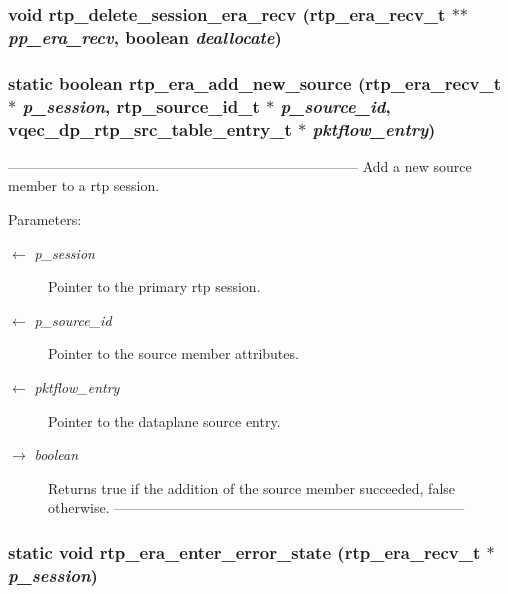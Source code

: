 \subsubsection{\setlength{\rightskip}{0pt plus 5cm}void rtp\_\-delete\_\-session\_\-era\_\-recv (\bf{rtp\_\-era\_\-recv\_\-t} $\ast$$\ast$ {\em pp\_\-era\_\-recv}, boolean {\em deallocate})}\label{rtp__era__recv_8c_ae0de64f6e196bf7a913d89433676de7}


\subsubsection{\setlength{\rightskip}{0pt plus 5cm}static boolean rtp\_\-era\_\-add\_\-new\_\-source (\bf{rtp\_\-era\_\-recv\_\-t} $\ast$ {\em p\_\-session}, rtp\_\-source\_\-id\_\-t $\ast$ {\em p\_\-source\_\-id}, vqec\_\-dp\_\-rtp\_\-src\_\-table\_\-entry\_\-t $\ast$ {\em pktflow\_\-entry})\hspace{0.3cm}{\tt  [static]}}\label{rtp__era__recv_8c_8cb96027af7de798ef6f5eebdfc0c857}


--------------------------------------------------------------------------- Add a new source member to a rtp session.

\begin{Desc}
\item[Parameters:]
\begin{description}
\item[\mbox{$\leftarrow$} {\em p\_\-session}]Pointer to the primary rtp session. \item[\mbox{$\leftarrow$} {\em p\_\-source\_\-id}]Pointer to the source member attributes. \item[\mbox{$\leftarrow$} {\em pktflow\_\-entry}]Pointer to the dataplane source entry. \item[\mbox{$\rightarrow$} {\em boolean}]Returns true if the addition of the source member succeeded, false otherwise. --------------------------------------------------------------------------- \end{description}
\end{Desc}
\subsubsection{\setlength{\rightskip}{0pt plus 5cm}static void rtp\_\-era\_\-enter\_\-error\_\-state (\bf{rtp\_\-era\_\-recv\_\-t} $\ast$ {\em p\_\-session})\hspace{0.3cm}{\tt  [static]}}\label{rtp__era__recv_8c_bb0bfa8092865d6147276c5c8d445df8}


